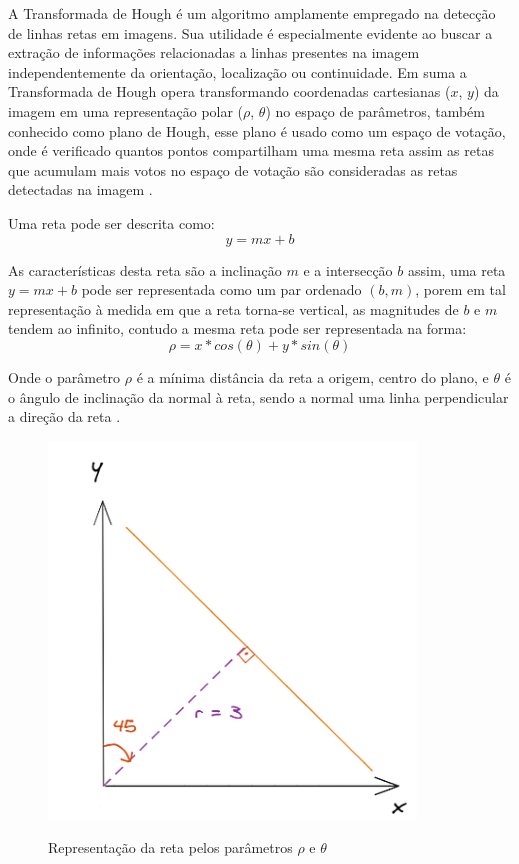 A Transformada de Hough é um algoritmo amplamente empregado na detecção de linhas retas em imagens. Sua utilidade é especialmente evidente ao buscar a extração de informações relacionadas a linhas presentes na imagem independentemente da orientação, localização ou continuidade. Em suma a Transformada de Hough opera transformando coordenadas cartesianas ($x$, $y$) da imagem em uma representação polar ($\rho$, $\theta$) no espaço de parâmetros, também conhecido como plano de Hough, esse plano é usado como um espaço de votação, onde é verificado quantos pontos compartilham uma mesma reta assim as retas que acumulam mais votos no espaço de votação são consideradas as retas detectadas na imagem \cite{transformadaHough1}.


Uma reta pode ser descrita como: $$y = mx + b$$

As características desta reta são a inclinação $m$ e a intersecção $b$ assim, uma reta $y = mx + b$ pode ser representada como um par ordenado $(b, m)$, porem em tal representação à medida em que a reta torna-se vertical, as magnitudes de $b$ e $m$ tendem ao infinito, contudo a mesma reta pode ser representada na forma:  $$\rho = x*cos(\theta)+y*sin(\theta)$$

Onde o parâmetro $\rho$ é a mínima distância da reta a origem, centro do plano, e $\theta$ é o ângulo de inclinação da normal à reta, sendo a normal uma linha perpendicular a direção da reta \cite{detectBar}.

\begin{figure}[H]
	\centering
    \caption{Representação da reta pelos parâmetros $\rho$ e $\theta$}
	\includegraphics[scale=2]{figuras/math/rhotheta.png}
    \label{fig:Representacao da reta pelos parametros}
\end{figure}

